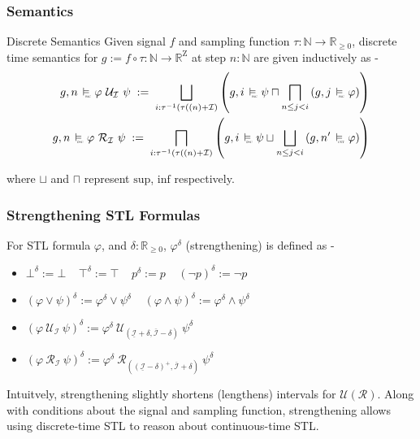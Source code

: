 \documentclass{beamer}
\newcommand{\typeTime}{\mathbb{R}_{\geq 0}}
\newcommand{\typeReal}{\mathbb{R}}
\newcommand{\typeNat}{\mathbb{N}}
\newcommand{\until}{\mathcal{U}}
\newcommand{\release}{\mathcal{R}}
\newcommand{\interval}{\mathcal{I}}
\newcommand{\Z}{\text{Z}}
\newcommand{\discrete}{\raisebox{-0.1ex}{\scalebox{0.25}{\textrm{DSC}}}}
\newcommand{\cont}{\raisebox{-0.1ex}{\scalebox{0.25}{\textrm{CNT}}}}
\newcommand{\discreteSatisfy}{\ \stackMath\stackunder[0pt]{\vDash}{\hspace*{0.3em}\discrete}\ }
\newcommand{\contSatisfy}{\ \stackMath\stackunder[0pt]{\vDash}{\hspace*{0.3em}\cont}\ }
\newcommand{\robustAssign}{\; := \;}
\begin{document}
\begin{frame}
    \frametitle{Semantics}
    \begin{block}{Discrete Semantics}
        Given signal $f$ and sampling function $\tau : \typeNat
        \to \typeTime$, discrete time semantics for $g := f \circ \tau : \typeNat
        \to  \typeReal^{\Z}$ at step $n:\typeNat$ are given inductively as -
        \begin{align*}
            g, n \discreteSatisfy \varphi\ \until_{\interval}\ \psi
            \robustAssign \bigsqcup_{i: \tau^{-1}(\tau((n) +\interval)}\left( g, i \discreteSatisfy \psi
           \sqcap \bigsqcap_{n \leq j < i} \left( g, j \discreteSatisfy \varphi
            \right ) \right) \\
            g, n \discreteSatisfy \varphi\ \release_{\interval}\ \psi
           \robustAssign \bigsqcap_{i: \tau^{-1}(\tau((n) +\interval)} \left( g, i \discreteSatisfy \psi
           \sqcup \bigsqcup_{n \leq j < i} \left( g, n' \contSatisfy \varphi
            \right ) \right)
        \end{align*}
    \end{block}
    where $\sqcup$ and $\sqcap$ represent $\text{sup}$, $\text{inf}$ respectively.
\end{frame}

\begin{frame}
    \frametitle{Strengthening STL Formulas}
    For STL formula $\varphi$, and $\delta : \typeTime$,
    $\varphi^{\delta}$ (strengthening) is defined as -
    \begin{itemize}
        \item $\bot^{\delta} := \bot \;\;\;\; \top^{\delta} := \top   \;\;\;\; p^{\delta} := p
            \;\;\;\; (\neg p)^{\delta} := \neg p$
        \item $(\varphi \vee \psi)^{\delta} := \varphi^{\delta} \vee \psi^{\delta}
            \;\;\;\; (\varphi \wedge \psi)^{\delta} := \varphi^{\delta} \wedge \psi^{\delta}$
        \item $(\varphi\ \until_{\interval}\ \psi)^{\delta} := \varphi^{\delta} \
            \until_{\left (\underline{\interval} + \delta, \overline{\interval}
            - \delta \right)}\ \psi^{\delta}$
        \item $(\varphi\ \release_{\interval}\ \psi)^{\delta} := \varphi^{\delta} \
            \release_{\left ((\underline{\interval} - \delta)^{+}, \overline{\interval}
            + \delta \right)}\ \psi^{\delta}$
    \end{itemize}
    Intuitvely, strengthening slightly shortens (lengthens) intervals
    for $\until (\release) $. Along with conditions about the signal
    and sampling function, strengthening allows using discrete-time
    STL to reason about continuous-time STL.
\end{frame}
\end{document}
